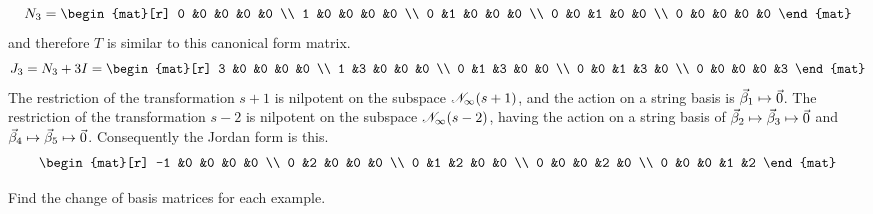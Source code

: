 \begin{exercises}
\begin{answer}
\begin{exparts}
\begin{equation*}
            N_3=
            \begin{mat}[r]
               0  &0  &0  &0  &0  \\
               1  &0  &0  &0  &0  \\
               0  &1  &0  &0  &0  \\
               0  &0  &1  &0  &0  \\
               0  &0  &0  &0  &0
             \end{mat}
          \end{equation*}
          and therefore $T$ is similar to this canonical form matrix.
          \begin{equation*}
           J_3=N_3+3I=
           \begin{mat}[r]
               3  &0  &0  &0  &0  \\
               1  &3  &0  &0  &0  \\
               0  &1  &3  &0  &0  \\
               0  &0  &1  &3  &0  \\
               0  &0  &0  &0  &3
             \end{mat}
         \end{equation*} 
         \partsitem The restriction of the transformation $s+1$ is nilpotent
          on the subspace $\mathscr{N}_\infty(s+1)$, and the action on a 
          string basis is  $\vec{\beta}_1\mapsto\vec{0}$.  
          The restriction of the transformation $s-2$ is nilpotent
          on the subspace $\mathscr{N}_\infty(s-2)$, having the action on a 
          string basis of $\vec{\beta}_2\mapsto\vec{\beta}_3\mapsto\vec{0}$
          and $\vec{\beta}_4\mapsto\vec{\beta}_5\mapsto\vec{0}$.        
          Consequently the Jordan form is this.
          \begin{equation*}
            \begin{mat}[r]
              -1  &0  &0  &0  &0  \\
               0  &2  &0  &0  &0  \\
               0  &1  &2  &0  &0  \\
               0  &0  &0  &2  &0  \\
               0  &0  &0  &1  &2
             \end{mat} 
          \end{equation*}
      \end{exparts}  
    \end{answer}
  \item 
    Find the change of basis matrices for each example. 

\end{exercises}
